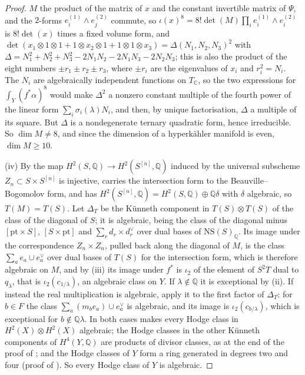 \documentclass[11pt,reqno]{amsart}
\theoremstyle{plain}
\theoremstyle{definition}
\theoremstyle{remark}
\newcommand{\QQ}{\mathbb{Q}}
\newcommand{\CC}{\mathbb{C}}
\newcommand{\NS}{\mathrm{NS}}
\begin{document}
\begin{proof}
$M$ the product of the matrix of $x$ and the constant invertible matrix of
$\Psi$, and the $2$-forms $e_{i}^{(1)}\wedge e_{j}^{(2)}$ commute, so
$\iota(x)^{8}=8!\det(M)\prod_{i}e_{i}^{(1)}\wedge e_{i}^{(2)}$ is $8!\det(x)$
times a fixed volume form, and
$\det(x_{1}\otimes1\otimes1+1\otimes x_{2}\otimes1+1\otimes1\otimes
x_{3})=\Delta(N_{1},N_{2},N_{3})^{2}$ with
$\Delta=N_{1}^{2}+N_{2}^{2}+N_{3}^{2}-2N_{1}N_{2}-2N_{1}N_{3}-2N_{2}N_{3}$;
this is also the product of the eight numbers $\pm r_{1}\pm r_{2}\pm r_{3}$,
where $\pm r_{i}$ are the eigenvalues of $x_{i}$ and $r_{i}^{2}=N_{i}$. The
$N_{i}$ are algebraically independent functions on $T_{\CC}$, so the two
expressions for $\int_{Y}(f^{*}\alpha)^{8}$ would make $\Delta^{2}$ a nonzero
constant multiple of the fourth power of the linear form
$\sum_{i}\sigma_{i}(\lambda)N_{i}$, and then, by unique factorisation,
$\Delta$ a multiple of its square. But $\Delta$ is a nondegenerate
ternary quadratic form, hence irreducible. So $\dim M\ne8$, and since the
dimension of a hyperk\"ahler manifold is even, $\dim M\ge10$.

(iv) By \cite{Bea83} the map $H^{2}(S,\QQ)\to H^{2}(S^{[n]},\QQ)$ induced by
the universal subscheme $Z_{n}\subset S\times S^{[n]}$ is injective, carries
the intersection form to the Beauville--Bogomolov form, and has
$H^{2}(S^{[n]},\QQ)=H^{2}(S,\QQ)\oplus\QQ\delta$ with $\delta$ algebraic, so
$T(M)=T(S)$. Let $\Delta_{T}$ be the K\"unneth component in $T(S)\otimes
T(S)$ of the class of the diagonal of $S$; it is algebraic, being the class
of the diagonal minus $[\mathrm{pt}\times S]$, $[S\times\mathrm{pt}]$ and
$\sum_{r}d_{r}\times d_{r}^{\vee}$ over dual bases of $\NS(S)_{\QQ}$. Its image
under the correspondence $Z_{n}\times Z_{n}$, pulled back along the diagonal
of $M$, is the class $\sum_{a}e_{a}\cup e_{a}^{\vee}$ over dual bases of
$T(S)$ for the intersection form, which is therefore algebraic on $M$, and by
(iii) its image under $f^{*}$ is $\iota_{2}$ of the element of $S^{2}T$ dual
to $q_{\lambda}$, that is $\iota_{2}(c_{1/\lambda})$, an algebraic class on
$Y$. If $\lambda\notin\QQ$ it is exceptional by (ii). If instead the real
multiplication is algebraic, apply it to the first factor of $\Delta_{T}$:
for $b\in F$ the class $\sum_{a}(m_{b}e_{a})\cup e_{a}^{\vee}$ is algebraic,
and its image is $\iota_{2}(c_{b/\lambda})$, which is exceptional for
$b\notin\QQ\lambda$. In both cases  makes every
Hodge class in $H^{2}(X)\otimes H^{2}(X)$ algebraic; the Hodge classes in the
other K\"unneth components of $H^{4}(Y,\QQ)$ are products of divisor classes,
as at the end of the proof of ; and the Hodge classes of
$Y$ form a ring generated in degrees two and four (proof of
). So every Hodge class of $Y$ is algebraic.
\end{proof}
\end{document}
